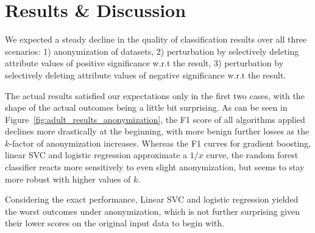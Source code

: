 \documentclass{llncs}
\begin{document}
\section{Results \& Discussion}
\label{sect:results}

We expected a steady decline in the quality of classification results over all three scenarios: 1) anonymization of datasets, 2) perturbation by selectively deleting attribute values of positive significance w.r.t the result, 3) perturbation by selectively deleting attribute values of negative significance w.r.t the result.

The actual results satisfied our expectations only in the first two cases, with the shape of the actual outcomes being a little bit surprising. As can be seen in Figure~\ref{fig:adult_results_anonymization}, the F1 score of all algorithms applied declines more drastically at the beginning, with more benign further losses as the $k$-factor of anonymization increases. Whereas the F1 curves for gradient boosting, linear SVC and logistic regression approximate a $1/x$ curve, the random forest classifier reacts more sensitively to even slight anonymization, but seems to stay more robust with higher values of $k$.

Considering the exact performance, Linear SVC and logistic regression yielded the worst outcomes under anonymization, which is not further surprising given their lower scores on the original input data to begin with.
\end{document}
